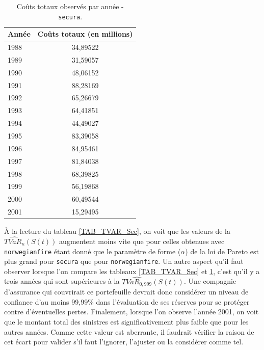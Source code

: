 		\begin{table}[H]
			\begin{center}
				\begin{tabular}{|l|c|}
					\hline
					Année & Coûts totaux (en millions) \\ \hline
					1988  &          34,89522          \\
					1989  &          31,59057          \\
					1990  &          48,06152          \\
					1991  &          88,28169          \\
					1992  &          65,26679          \\
					1993  &          64,41851          \\
					1994  &          44,49027          \\
					1995  &          83,39058          \\
					1996  &          84,95461          \\
					1997  &          81,84038          \\
					1998  &          68,39825          \\
					1999  &          56,19868          \\
					2000  &          60,49544          \\
					2001  &          15,29495          \\ \hline
				\end{tabular}
				\renewcommand{\tablename}{Tableau}
				\caption{Coûts totaux observés par année - \texttt{secura}.}\label{TAB_COUT_OBS_Sec}
			\end{center}
		\end{table}
	
		À la lecture du tableau \ref{TAB_TVAR_Sec}, on voit que les valeurs de la  $\widehat{TVaR_{\kappa}}(S(t))$ augmentent moins vite que pour celles obtenues avec \texttt{norwegianfire} étant donné que le paramètre de forme ($\alpha$) de la loi de Pareto est plus grand pour \texttt{secura} que pour \texttt{norwegianfire}. Un autre aspect qu'il faut observer lorsque l'on compare les tableaux \ref{TAB_TVAR_Sec} et \ref{TAB_COUT_OBS_Sec}, c'est qu'il y a trois années qui sont supérieures à la $\widehat{TVaR_{0,999}}(S(t))$. Une compagnie d'assurance qui couvrirait ce portefeuille devrait donc considérer un niveau de confiance d'au moins 99,99\% dans l'évaluation de ses réserves pour se protéger contre d'éventuelles pertes. Finalement, lorsque l'on observe l'année 2001, on voit que le montant total des sinistres est significativement plus faible que pour les autres années. Comme cette valeur est aberrante, il faudrait vérifier la raison de cet écart pour valider s'il faut l'ignorer, l'ajuster ou la considérer comme tel.
		
